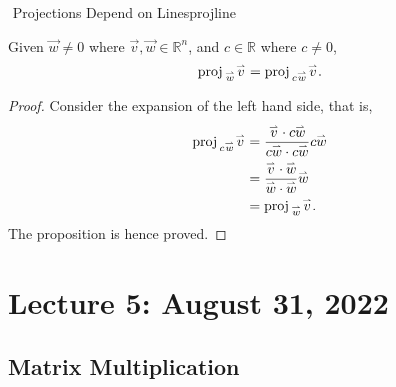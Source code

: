         \begin{theorem}{\Stop\,\,Projections Depend on Lines}{projline}
        
            Given \(\vec{w}\neq0\) where \(\vec{v},\vec{w}\in\mathbb{R}^n\), and \(c\in\mathbb{R}\) where \(c\neq0\),
            \begin{equation*}
                \proj_{\vec{w}}\vec{v}=\proj_{c\vec{w}}\vec{v}.
            \end{equation*}
            \begin{proof}
                Consider the expansion of the left hand side, that is,
                \begin{align*}
                    \proj_{c\vec{w}}\vec{v}&=\frac{\vec{v}\cdot c\vec{w}}{c\vec{w}\cdot c\vec{w}}c\vec{w} \\
                    &=\frac{\vec{v}\cdot \vec{w}}{\vec{w}\cdot \vec{w}}\vec{w} \\
                    &=\proj_{\vec{w}}\vec{v}.
                \end{align*}
                The proposition is hence proved.
            \end{proof}
        
        \end{theorem}
\pagebreak

\section{Lecture 5: August 31, 2022}
        
    \subsection{Matrix Multiplication}
    
